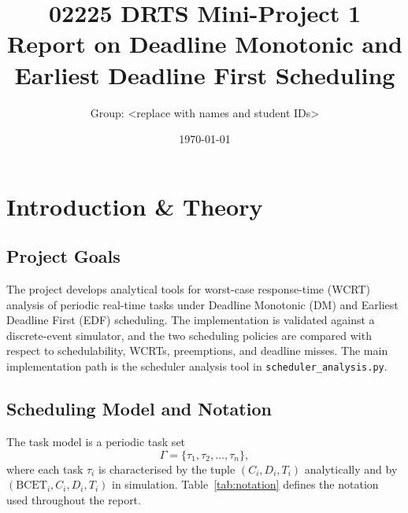 \documentclass[11pt,a4paper]{article}
\title{02225 DRTS Mini-Project 1\\Report on Deadline Monotonic and Earliest Deadline First Scheduling}
\author{Group: <replace with names and student IDs>}
\date{\today}
\begin{document}
\maketitle

\section{Introduction \& Theory}

\subsection{Project Goals}
The project develops analytical tools for worst-case response-time (WCRT) analysis of periodic real-time tasks under Deadline Monotonic (DM) and Earliest Deadline First (EDF) scheduling. The implementation is validated against a discrete-event simulator, and the two scheduling policies are compared with respect to schedulability, WCRTs, preemptions, and deadline misses. The main implementation path is the scheduler analysis tool in \texttt{scheduler\_analysis.py}.

\subsection{Scheduling Model and Notation}
The task model is a periodic task set
\begin{equation}
\Gamma = \{\tau_1, \tau_2, \ldots, \tau_n\},
\end{equation}
where each task \(\tau_i\) is characterised by the tuple \((C_i, D_i, T_i)\) analytically and by \((\mathrm{BCET}_i, C_i, D_i, T_i)\) in simulation. Table~\ref{tab:notation} defines the notation used throughout the report.
\end{document}
